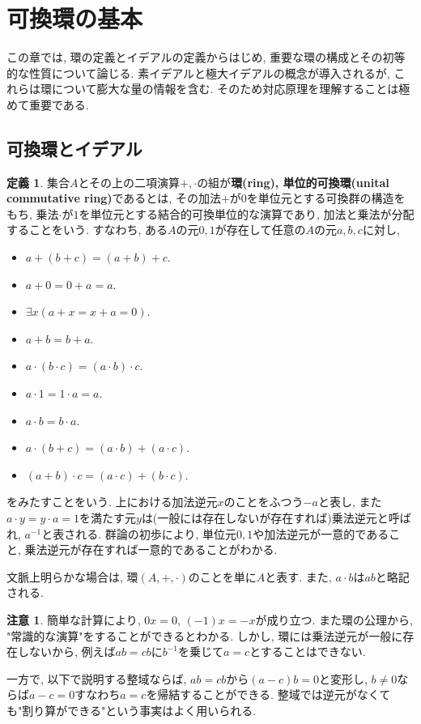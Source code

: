 \documentclass[a4paper, twoside]{bxjsarticle}
\newcommand{\tb}{\textbf}
\theoremstyle{definition}
\newtheorem{defn}[thm]{定義}
\newtheorem{rem}[thm]{注意}
\begin{document}
    \section{可換環の基本}
        この章では, 環の定義とイデアルの定義からはじめ, 重要な環の構成とその初等的な性質について論じる.
        素イデアルと極大イデアルの概念が導入されるが, これらは環について膨大な量の情報を含む. そのため対応原理を理解することは極めて重要である.
        \subsection{可換環とイデアル}
        \begin{defn}
            集合$A$とその上の二項演算$+, \cdot$の組が\tb{環(ring), 単位的可換環(unital commutative ring)}であるとは, その加法$+$が$0$を単位元とする可換群の構造をもち, 乗法$\cdot$が$1$を単位元とする結合的可換単位的な演算であり, 加法と乗法が分配することをいう. すなわち, ある$A$の元$0, 1$が存在して任意の$A$の元$a, b, c$に対し, 
            \begin{itemize}
                \item $a+(b+c)=(a+b)+c$.
                \item $a+0=0+a=a$.
                \item $\exists x (a+x=x+a=0)$.
                \item $a+b=b+a$.
                \item $a\cdot(b\cdot c)=(a\cdot b)\cdot c$.
                \item $a\cdot 1=1\cdot a = a$.
                \item $a\cdot b = b\cdot a$.
                \item $a\cdot(b+c) = (a\cdot b)+(a\cdot c)$.
                \item $(a+b)\cdot c = (a\cdot c)+(b\cdot c)$.
            \end{itemize}
            をみたすことをいう. 上における加法逆元$x$のことをふつう$-a$と表し, また$a\cdot y=y\cdot a=1$を満たす元$y$は(一般には存在しないが存在すれば)乗法逆元と呼ばれ, $a^{-1}$と表される. 群論の初歩により, 単位元$0, 1$や加法逆元が一意的であること, 乗法逆元が存在すれば一意的であることがわかる.
            
            文脈上明らかな場合は, 環$(A, +, \cdot)$のことを単に$A$と表す. また, $a\cdot b$は$ab$と略記される. 
        \end{defn}
        \begin{rem}
            簡単な計算により, $0x = 0$, $(-1)x=-x$が成り立つ. また環の公理から, "常識的な演算"をすることができるとわかる.
            しかし, 環には乗法逆元が一般に存在しないから, 例えば$ab=cb$に$b^{-1}$を乗じて$a=c$とすることはできない.

            一方で, 以下で説明する整域ならば, $ab=cb$から$(a-c)b=0$と変形し, $b\neq 0 $ならば$a-c=0$すなわち$a=c$を帰結することができる. 整域では逆元がなくても"割り算ができる"という事実はよく用いられる.
        \end{rem}
\end{document}
